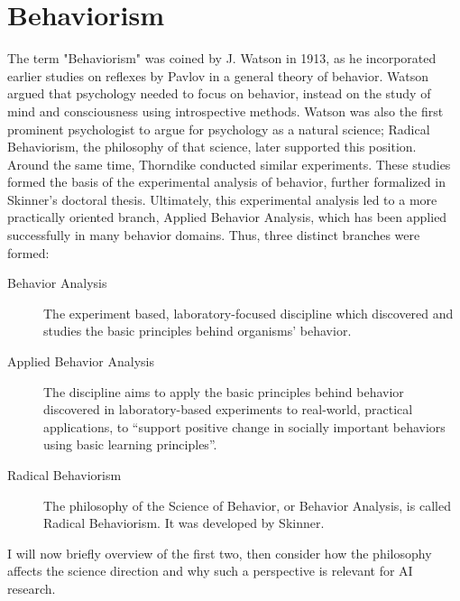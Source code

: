 \documentclass[letterpaper,11pt,twocolumn]{article}
\begin{document}
\section*{Behaviorism}
The term "Behaviorism" was coined by J. Watson in 1913\cite{maloneDidJohnWatson2014}, as he incorporated earlier studies on reflexes by Pavlov in a general theory of behavior. Watson argued that psychology needed to focus on behavior, instead on the study of mind and consciousness using introspective methods. Watson was also the first prominent psychologist to argue for psychology as a natural science; Radical Behaviorism, the philosophy of that science, later supported this position. Around the same time, Thorndike conducted similar experiments. These studies formed the basis of the experimental analysis of behavior, further formalized in Skinner's doctoral thesis\cite{skinnerBehaviorOrganismsExperimental1999}. Ultimately, this experimental analysis led to a more practically oriented branch, Applied Behavior Analysis, which has been applied successfully in many behavior domains\cite{wlABABehaviorScience2022}.
Thus, three distinct branches were formed:
\begin{description}
    \item[Behavior Analysis] The experiment based, laboratory-focused discipline which discovered and studies the basic principles behind organisms' behavior.
    \item[Applied Behavior Analysis] The discipline aims to apply the basic principles behind behavior discovered in laboratory-based experiments to real-world, practical applications, to \enquote{support positive change in socially important behaviors using basic learning principles}.
    \item[Radical Behaviorism] The philosophy of the Science of Behavior, or Behavior Analysis, is called Radical Behaviorism. It was developed by Skinner\cite{schneiderHistoryTermRadical1987}.
\end{description}

I will now briefly overview of the first two, then consider how the philosophy affects the science direction and why such a perspective is relevant for AI research.
\end{document}
